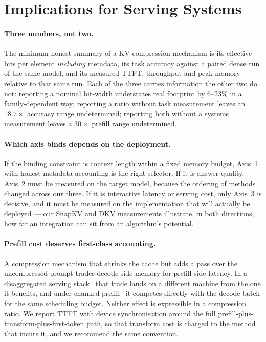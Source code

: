\documentclass[sigplan,10pt,anonymous,review,nonacm]{acmart}
\begin{document}
\section{Implications for Serving Systems}
\label{sec:discussion}

\paragraph{Three numbers, not two.}
The minimum honest summary of a KV-compression mechanism is its effective bits
per element \emph{including} metadata, its task accuracy against a paired
dense run of the same model, and its measured TTFT, throughput and peak memory
relative to that same run. Each of the three carries information the other two
do not: reporting a nominal bit-width understates real footprint by
$6$--$23\%$ in a family-dependent way; reporting a ratio without task
measurement leaves an $18.7\times$ accuracy range undetermined; reporting both
without a systems measurement leaves a $30\times$ prefill range undetermined.

\paragraph{Which axis binds depends on the deployment.}
If the binding constraint is context length within a fixed memory budget,
Axis~1 with honest metadata accounting is the right selector. If it is answer
quality, Axis~2 must be measured on the target model, because the ordering of
methods changed across our three. If it is interactive latency or serving
cost, only Axis~3 is decisive, and it must be measured on the implementation
that will actually be deployed --- our SnapKV and DKV measurements illustrate,
in both directions, how far an integration can sit from an algorithm's
potential.

\paragraph{Prefill cost deserves first-class accounting.}
A compression mechanism that shrinks the cache but adds a pass over the
uncompressed prompt trades decode-side memory for prefill-side latency. In a
disaggregated serving stack~\cite{zhong2024distserve} that trade lands on a
different machine from the one it benefits, and under chunked
prefill~\cite{agrawal2024sarathi} it competes directly with the decode batch
for the same scheduling budget. Neither effect is expressible in a compression
ratio. We report TTFT with device synchronisation around the full
prefill-plus-transform-plus-first-token path, so that transform cost is
charged to the method that incurs it, and we recommend the same convention.
\end{document}
